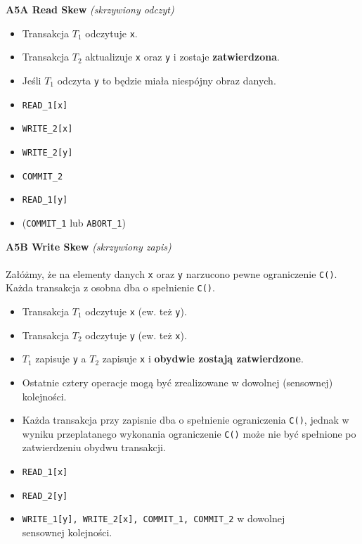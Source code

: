 \documentclass[a5paper,6pt]{article}
\begin{document}
    \textbf{A5A Read Skew} \textit{(skrzywiony odczyt)}
    \begin{itemize}
        \item Transakcja $T_1$ odczytuje \texttt{x}.
        \item Transakcja $T_2$ aktualizuje \texttt{x} oraz \texttt{y} i zostaje
              \textbf{zatwierdzona}.
        \item Jeśli $T_1$ odczyta \texttt{y} to będzie miała niespójny obraz
              danych.
        \item \texttt{READ\_1[x]}
        \item \texttt{WRITE\_2[x]}
        \item \texttt{WRITE\_2[y]}
        \item \texttt{COMMIT\_2}
        \item \texttt{READ\_1[y]}
        \item (\texttt{COMMIT\_1} lub \texttt{ABORT\_1})
    \end{itemize}


    \textbf{A5B Write Skew} \textit{(skrzywiony zapis)}\\\\
    Załóżmy, że na elementy danych \texttt{x} oraz \texttt{y} narzucono pewne
    ograniczenie \texttt{C()}. Każda transakcja z osobna dba o spełnienie
    \texttt{C()}.
    \begin{itemize}
        \item Transakcja $T_1$ odczytuje \texttt{x} (ew. też \texttt{y}).
        \item Transakcja $T_2$ odczytuje \texttt{y} (ew. też \texttt{x}).
        \item $T_1$ zapisuje \texttt{y} a $T_2$ zapisuje \texttt{x} i
              \textbf{obydwie zostają zatwierdzone}.
        \item Ostatnie cztery operacje mogą być zrealizowane w dowolnej
              (sensownej) kolejności.
        \item Każda transakcja przy zapisnie dba o spełnienie ograniczenia
              \texttt{C()}, jednak w wyniku przeplatanego wykonania ograniczenie
              \texttt{C()} może nie być spełnione po zatwierdzeniu obydwu
              transakcji.
        \item \texttt{READ\_1[x]}
        \item \texttt{READ\_2[y]}
        \item \texttt{WRITE\_1[y], WRITE\_2[x], COMMIT\_1, COMMIT\_2}
              w dowolnej\\ sensownej kolejności.
    \end{itemize}
\end{document}
